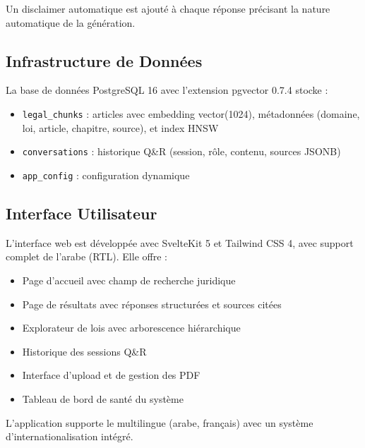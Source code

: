 Un disclaimer automatique est ajouté à chaque réponse précisant la nature
automatique de la génération.

\subsection{Infrastructure de Données}

La base de données PostgreSQL 16 avec l'extension pgvector 0.7.4 stocke :

\begin{itemize}
    \item \texttt{legal\_chunks} : articles avec embedding vector(1024),
    métadonnées (domaine, loi, article, chapitre, source), et index HNSW
    \item \texttt{conversations} : historique Q\&R (session, rôle,
    contenu, sources JSONB)
    \item \texttt{app\_config} : configuration dynamique
\end{itemize}

\subsection{Interface Utilisateur}

L'interface web \cite{src:web} est développée avec SvelteKit 5 et Tailwind
CSS 4, avec support complet de l'arabe (RTL). Elle offre :

\begin{itemize}
    \item Page d'accueil avec champ de recherche juridique
    \item Page de résultats avec réponses structurées et sources citées
    \item Explorateur de lois avec arborescence hiérarchique
    \item Historique des sessions Q\&R
    \item Interface d'upload et de gestion des PDF
    \item Tableau de bord de santé du système
\end{itemize}

L'application supporte le multilingue (arabe, français) avec un système
d'internationalisation intégré.